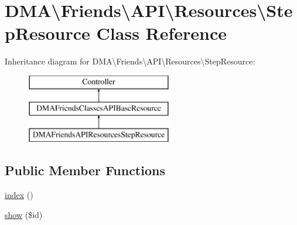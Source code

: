 \hypertarget{classDMA_1_1Friends_1_1API_1_1Resources_1_1StepResource}{}\section{D\+M\+A\textbackslash{}Friends\textbackslash{}A\+P\+I\textbackslash{}Resources\textbackslash{}Step\+Resource Class Reference}
\label{classDMA_1_1Friends_1_1API_1_1Resources_1_1StepResource}
Inheritance diagram for D\+M\+A\textbackslash{}Friends\textbackslash{}A\+P\+I\textbackslash{}Resources\textbackslash{}Step\+Resource\+:\begin{figure}[H]
\begin{center}
\leavevmode
\includegraphics[height=3.000000cm]{d5/de2/classDMA_1_1Friends_1_1API_1_1Resources_1_1StepResource}
\end{center}
\end{figure}
\subsection*{Public Member Functions}
\begin{DoxyCompactItemize}
\item 
\hyperlink{classDMA_1_1Friends_1_1API_1_1Resources_1_1StepResource_acf4d1ad088cbfddf36e178b42968a15c}{index} ()
\item 
\hyperlink{classDMA_1_1Friends_1_1API_1_1Resources_1_1StepResource_af0fbdc63eb208bf6993bd58d73d646d2}{show} (\$id)
\end{DoxyCompactItemize}
